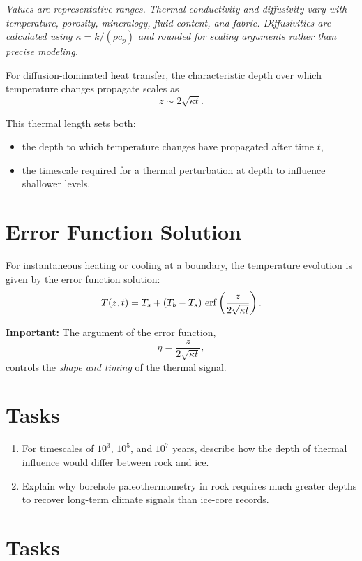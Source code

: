 \documentclass[11pt,a4paper]{article}
\begin{document}
\smallskip
\noindent
\textit{Values are representative ranges. Thermal conductivity and diffusivity
vary with temperature, porosity, mineralogy, fluid content, and fabric.
Diffusivities are calculated using $\kappa = k/(\rho c_p)$ and rounded for
scaling arguments rather than precise modeling.}

For diffusion-dominated heat transfer, the characteristic depth over which temperature changes propagate scales as
\[
z \sim 2 \sqrt{\kappa t}.
\]

This thermal length sets both:
\begin{itemize}
  \item the depth to which temperature changes have propagated after time $t$,
  \item the timescale required for a thermal perturbation at depth to influence
  shallower levels.
\end{itemize}

\section*{Error Function Solution}

For instantaneous heating or cooling at a boundary, the temperature evolution is given by the error function solution:
\[
T(z,t) = T_s + (T_b - T_s)\,
\erf \left(\frac{z}{2\sqrt{\kappa t}}\right).
\]

\textbf{Important:}  
The argument of the error function,
\[
\eta = \frac{z}{2\sqrt{\kappa t}},
\]
controls the \emph{shape and timing} of the thermal signal.



\section*{Tasks}
\begin{enumerate}
  \item For timescales of $10^3$, $10^5$, and $10^7$ years, describe how the depth of thermal influence would differ between rock and ice.

  \item Explain why borehole paleothermometry in rock requires much greater depths to recover long-term climate signals than ice-core records.
\end{enumerate}


\section*{Tasks}
\end{document}
